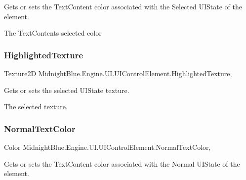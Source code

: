 Gets or sets the Text\+Content color associated with the Selected U\+I\+State of the element. 

The Text\+Contents selected color\hypertarget{class_midnight_blue_1_1_engine_1_1_u_i_1_1_u_i_control_element_abcbcffad4ffa1633a54848c7621472b4}{}\label{class_midnight_blue_1_1_engine_1_1_u_i_1_1_u_i_control_element_abcbcffad4ffa1633a54848c7621472b4} 
\subsubsection{\texorpdfstring{Highlighted\+Texture}{HighlightedTexture}}
{\footnotesize\ttfamily Texture2D Midnight\+Blue.\+Engine.\+U\+I.\+U\+I\+Control\+Element.\+Highlighted\+Texture\hspace{0.3cm}{\ttfamily [get]}, {\ttfamily [set]}}



Gets or sets the selected U\+I\+State texture. 

The selected texture.\hypertarget{class_midnight_blue_1_1_engine_1_1_u_i_1_1_u_i_control_element_a11c782ceedc17ca92ef6e479c504d96d}{}\label{class_midnight_blue_1_1_engine_1_1_u_i_1_1_u_i_control_element_a11c782ceedc17ca92ef6e479c504d96d} 
\subsubsection{\texorpdfstring{Normal\+Text\+Color}{NormalTextColor}}
{\footnotesize\ttfamily Color Midnight\+Blue.\+Engine.\+U\+I.\+U\+I\+Control\+Element.\+Normal\+Text\+Color\hspace{0.3cm}{\ttfamily [get]}, {\ttfamily [set]}}



Gets or sets the Text\+Content color associated with the Normal U\+I\+State of the element. 

